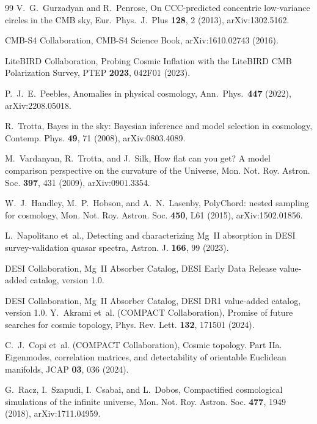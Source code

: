 \documentclass[
  aps,
  prd,
  reprint,
  superscriptaddress,
  nofootinbib,
  longbibliography,
  floatfix,
  amsmath,
  amssymb
]{revtex4-2}
\theoremstyle{plain}
\theoremstyle{definition}
\theoremstyle{remark}
\begin{document}
\begin{thebibliography}{99}
V.~G.~Gurzadyan and R.~Penrose,
On CCC-predicted concentric low-variance circles in the CMB sky,
Eur.\ Phys.\ J.\ Plus \textbf{128}, 2 (2013), arXiv:1302.5162.

CMB-S4 Collaboration, CMB-S4 Science Book, arXiv:1610.02743 (2016).

LiteBIRD Collaboration,
Probing Cosmic Inflation with the LiteBIRD CMB Polarization Survey,
PTEP \textbf{2023}, 042F01 (2023).

P.~J.~E.~Peebles,
Anomalies in physical cosmology,
Ann.\ Phys.\ \textbf{447} (2022), arXiv:2208.05018.


R.~Trotta,
Bayes in the sky: Bayesian inference and model selection in cosmology,
Contemp. Phys. \textbf{49}, 71 (2008), arXiv:0803.4089.

M.~Vardanyan, R.~Trotta, and J.~Silk,
How flat can you get? A model comparison perspective on the curvature of the Universe,
Mon. Not. Roy. Astron. Soc. \textbf{397}, 431 (2009), arXiv:0901.3354.



W.~J.~Handley, M.~P.~Hobson, and A.~N.~Lasenby,
PolyChord: nested sampling for cosmology,
Mon. Not. Roy. Astron. Soc. \textbf{450}, L61 (2015),
arXiv:1502.01856.

L.~Napolitano et~al.,
Detecting and characterizing Mg~II absorption in DESI survey-validation quasar spectra,
Astron. J. \textbf{166}, 99 (2023).

DESI Collaboration,
Mg~II Absorber Catalog, DESI Early Data Release value-added catalog, version 1.0.

DESI Collaboration,
Mg~II Absorber Catalog, DESI DR1 value-added catalog, version 1.0.
Y.~Akrami et~al. (COMPACT Collaboration),
Promise of future searches for cosmic topology,
Phys. Rev. Lett. \textbf{132}, 171501 (2024).

C.~J.~Copi et~al. (COMPACT Collaboration),
Cosmic topology. Part IIa. Eigenmodes, correlation matrices, and detectability of orientable Euclidean manifolds,
JCAP \textbf{03}, 036 (2024).

G.~Racz, I.~Szapudi, I.~Csabai, and L.~Dobos,
Compactified cosmological simulations of the infinite universe,
Mon. Not. Roy. Astron. Soc. \textbf{477}, 1949 (2018), arXiv:1711.04959.


\end{thebibliography}
\end{document}
